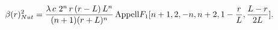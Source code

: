 \begin{equation}
\beta(r)_{Nut}^2=\frac{\lambda\,c\,\,
2^{n}\,r\,(r-L)\,L^{n}}{(n+1)(r+L)^{n}}\,{\rm{Appell}}F_{1}[n+1,2,-n,n+2,1-\frac{r}{L},\frac{L-r}{2L}].\label{appel1}
\end{equation}

